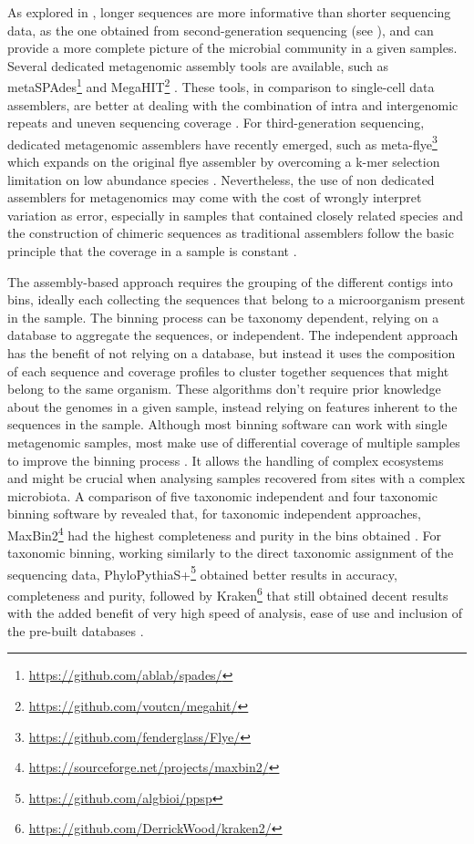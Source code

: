 As explored in , longer sequences are more informative than shorter sequencing data, as the one obtained from second-generation sequencing (see ), and can provide a more complete picture of the microbial community in a given samples. 
Several dedicated metagenomic assembly tools are available, such as metaSPAdes\footnote{\url{https://github.com/ablab/spades/}}  and MegaHIT\footnote{\url{https://github.com/voutcn/megahit/}} \citep{nurk_metaspades_2017, li_megahit_2015}. 
These tools, in comparison to single-cell data assemblers, are better at dealing with the combination of intra and intergenomic repeats and uneven sequencing coverage \citep{olson_metagenomic_2017}.
For third-generation sequencing, dedicated metagenomic assemblers have recently emerged, such as meta-flye\footnote{\url{https://github.com/fenderglass/Flye/}} which expands on the original flye assembler by overcoming a k-mer selection limitation on low abundance species \citep{kolmogorov_metaflye_2020}. Nevertheless, the use of non dedicated assemblers for metagenomics may come with the cost of wrongly interpret variation as error, especially in samples that contained closely related species and the construction of chimeric sequences as traditional assemblers follow the basic principle that the coverage in a sample is constant \citep{teeling_current_2012}. 

The assembly-based approach requires the grouping of the different contigs into bins, ideally each collecting the sequences that belong to a microorganism present in the sample. The binning process can be taxonomy dependent, relying on a database to aggregate the sequences, or independent. The independent approach has the benefit of not relying on a database, but instead it uses the composition of each sequence and coverage profiles to cluster together sequences that might belong to the same organism. These algorithms don’t require prior knowledge about the genomes in a given sample, instead relying on features inherent to the sequences in the sample. Although most binning software can work with single metagenomic samples, most make use of differential coverage of multiple samples to improve the binning process \citep{sedlar_bioinformatics_2017}. It allows the handling of complex ecosystems and might be crucial when analysing samples recovered from sites with a complex microbiota. A comparison of five taxonomic independent  and four taxonomic binning software by \cite{sczyrba_critical_2017} revealed that, for taxonomic independent approaches, MaxBin2\footnote{\url{https://sourceforge.net/projects/maxbin2/}} had the highest completeness and purity in the bins obtained \citep{}. For taxonomic binning, working similarly to the direct taxonomic assignment of the sequencing data, PhyloPythiaS+\footnote{\url{https://github.com/algbioi/ppsp}} obtained better results in accuracy, completeness and purity, followed by Kraken\footnote{\url{https://github.com/DerrickWood/kraken2/}} that still obtained decent results with the added benefit of very high speed of analysis, ease of use and inclusion of the pre-built databases \citep{gregor_phylopythias_2016, wood_kraken_2014}.

